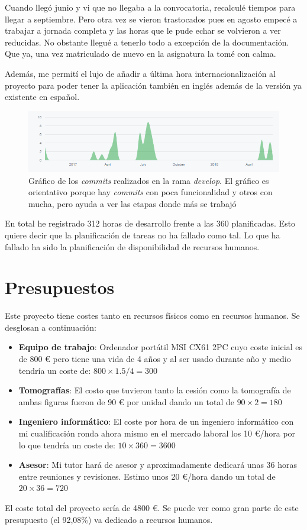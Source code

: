 Cuando llegó junio y vi que no llegaba a la convocatoria, recalculé tiempos para llegar a septiembre. Pero otra vez se vieron trastocados pues en agosto empecé a trabajar a jornada completa y las horas que le pude echar se volvieron a ver reducidas. No obstante llegué a tenerlo todo a excepción de la documentación. Que ya, una vez matriculado de nuevo en la asignatura la tomé con calma.

Además, me permití el lujo de añadir a última hora internacionalización al proyecto para poder tener la aplicación también en inglés además de la versión ya existente en español.

\begin{figure}[H]
	\centering
	\includegraphics[width=12cm]{imagenes/planificacion/resultados}
	\caption{Gráfico de los \textit{commits} realizados en la rama \textit{develop}. El gráfico es orientativo porque hay \textit{commits} con poca funcionalidad y otros con mucha, pero ayuda a ver las etapas donde más se trabajó}
	\label{fig:planificacion/resultados}
\end{figure}

En total he registrado 312 horas de desarrollo frente a las 360 planificadas. Esto quiere decir que la planificación de tareas no ha fallado como tal. Lo que ha fallado ha sido la planificación de disponibilidad de recursos humanos.

\section{Presupuestos}

Este proyecto tiene costes tanto en recursos físicos como en recursos humanos. Se desglosan a continuación:

\begin{itemize}
	\item \textbf{Equipo de trabajo}: Ordenador portátil MSI CX61 2PC cuyo coste inicial es de 800 \euro{} pero tiene una vida de 4 años y al ser usado durante año y medio tendría un coste de: $ 800 \times 1.5 / 4 = 300 $
	\item \textbf{Tomografías}: El costo que tuvieron tanto la cesión como la tomografía de ambas figuras fueron de 90 \euro{} por unidad dando un total de $ 90 \times 2 = 180 $
	\item \textbf{Ingeniero informático}: El coste por hora de un ingeniero informático con mi cualificación ronda ahora mismo en el mercado laboral los 10 \euro{}/hora por lo que tendría un coste de: $ 10 \times 360 = 3600 $
	\item \textbf{Asesor}: Mi tutor hará de asesor y aproximadamente dedicará unas 36 horas entre reuniones y revisiones. Estimo unos 20 \euro{}/hora dando un total de $ 20 \times 36 = 720$
\end{itemize}

El coste total del proyecto sería de 4800 \euro{}. Se puede ver como gran parte de este presupuesto (el 92,08\%) va dedicado a recursos humanos.